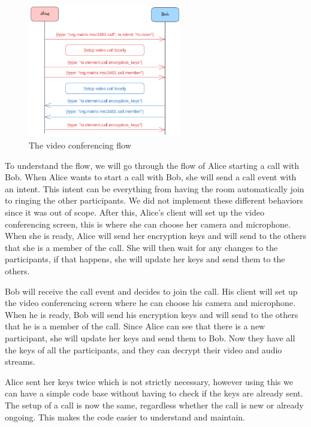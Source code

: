\documentclass{report}
\begin{document}
\begin{figure}
\centering
\includegraphics[width=0.6\textwidth]{img/Callflow.excalidraw.png}
\caption{The video conferencing flow}
\label{fig:video-conference-flow}
\end{figure}

To understand the flow, we will go through the flow of Alice starting a call with Bob.
When Alice wants to start a call with Bob, she will send a call event with an intent. This intent can be
everything from having the room automatically join to ringing the other participants. We did not implement
these different behaviors since it was out of scope. After this, Alice's client will set up the video conferencing
screen, this is where she can choose her camera and microphone. When she is ready, Alice will send her encryption
keys and will send to the others that she is a member of the call. She will then wait for any changes to the
participants, if that happens, she will update her keys and send them to the others.

Bob will receive the call event and decides to join the call. His client will set up the video conferencing
screen where he can choose his camera and microphone. When he is ready, Bob will send his encryption keys and will
send to the others that he is a member of the call. Since Alice can see that there is a new participant, she will
update her keys and send them to Bob. Now they have all the keys of all the participants, and they can decrypt their
video and audio streams.

Alice sent her keys twice which is not strictly necessary, however using this we can have a simple code base
without having to check if the keys are already sent. The setup of a call is now the same, regardless whether
the call is new or already ongoing. This makes the code easier to understand and maintain.
\end{document}

